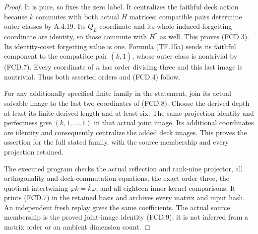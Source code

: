 \begin{proof}
It is pure, so fixes the zero label.  It centralizes
the faithful deck action because $k$ commutes with
both actual $H$ matrices; compatible pairs determine
outer classes by A.4.19.  Its $Q_L$ coordinate and
its whole induced-forgetting coordinate are identity,
so those commute with $H^\dagger$ as well.  This proves
(FCD.3).  Its identity-coset forgetting value is one.
Formula (TF.15a) sends its faithful component to the
compatible pair $(\overline k,1)$, whose outer class
is nontrivial by (FCD.7).  Every coordinate of $n$
has order dividing three and this last image is
nontrivial.  Thus both asserted orders and (FCD.4)
follow.

For any additionally specified finite family in the
statement, join its actual solvable image to the last
two coordinates of (FCD.8).  Choose the derived depth
at least its finite derived length and at least six.
The same projection identity and perfectness give
$(k,1,\ldots,1)$ in that actual joint image.  Its
additional coordinates are identity and consequently
centralize the added deck images.  This proves the
assertion for the full stated family, with the source
membership and every projection retained.

The executed program
checks the actual reflection and rank-nine projector,
all orthogonality and deck-commutation equations,
the exact order three, the quotient intertwining
$\varphi k=\overline k\varphi$, and all eighteen
inner-kernel comparisons.  It prints (FCD.7) in the
retained basis and archives every matrix and input
hash.  An independent fresh replay gives the same
coefficients.  The actual source membership is the
proved joint-image identity (FCD.9); it is not inferred
from a matrix order or an ambient dimension count.
\end{proof}
